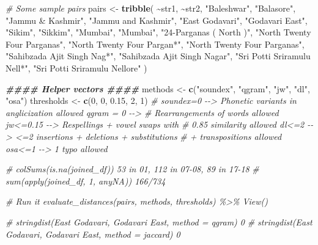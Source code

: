 \documentclass[
]{article}
\newenvironment{Shaded}{\begin{snugshade}}{\end{snugshade}}
\newcommand{\CommentTok}[1]{\textcolor[rgb]{0.56,0.35,0.01}{\textit{#1}}}
\newcommand{\DecValTok}[1]{\textcolor[rgb]{0.00,0.00,0.81}{#1}}
\newcommand{\DocumentationTok}[1]{\textcolor[rgb]{0.56,0.35,0.01}{\textbf{\textit{#1}}}}
\newcommand{\FloatTok}[1]{\textcolor[rgb]{0.00,0.00,0.81}{#1}}
\newcommand{\FunctionTok}[1]{\textcolor[rgb]{0.13,0.29,0.53}{\textbf{#1}}}
\newcommand{\NormalTok}[1]{#1}
\newcommand{\OtherTok}[1]{\textcolor[rgb]{0.56,0.35,0.01}{#1}}
\newcommand{\SpecialCharTok}[1]{\textcolor[rgb]{0.81,0.36,0.00}{\textbf{#1}}}
\newcommand{\StringTok}[1]{\textcolor[rgb]{0.31,0.60,0.02}{#1}}
\begin{document}
\begin{Shaded}
\begin{Highlighting}[]
\CommentTok{\# Some sample pairs}
\NormalTok{pairs }\OtherTok{\textless{}{-}} \FunctionTok{tribble}\NormalTok{(}
    \SpecialCharTok{\textasciitilde{}}\NormalTok{str1, }\SpecialCharTok{\textasciitilde{}}\NormalTok{str2, }\StringTok{"Baleshwar"}\NormalTok{, }\StringTok{"Balasore"}\NormalTok{, }\StringTok{"Jammu \& Kashmir"}\NormalTok{,}
    \StringTok{"Jammu and Kashmir"}\NormalTok{, }\StringTok{"East Godavari"}\NormalTok{, }\StringTok{"Godavari East"}\NormalTok{,}
    \StringTok{"Sikim"}\NormalTok{, }\StringTok{"Sikkim"}\NormalTok{, }\StringTok{"Mumbai"}\NormalTok{, }\StringTok{"Mumbai"}\NormalTok{, }\StringTok{"24{-}Parganas ( North )"}\NormalTok{,}
    \StringTok{"North Twenty Four Parganas"}\NormalTok{, }\StringTok{"North Twenty Four Pargan*"}\NormalTok{,}
    \StringTok{"North Twenty Four Parganas"}\NormalTok{, }\StringTok{"Sahibzada Ajit Singh Nag*"}\NormalTok{,}
    \StringTok{"Sahibzada Ajit Singh Nagar"}\NormalTok{, }\StringTok{"Sri Potti Sriramulu Nell*"}\NormalTok{,}
    \StringTok{"Sri Potti Sriramulu Nellore"}
\NormalTok{)}


\DocumentationTok{\#\#\#\# Helper vectors \#\#\#\#}
\NormalTok{methods }\OtherTok{\textless{}{-}} \FunctionTok{c}\NormalTok{(}\StringTok{"soundex"}\NormalTok{, }\StringTok{"qgram"}\NormalTok{, }\StringTok{"jw"}\NormalTok{, }\StringTok{"dl"}\NormalTok{, }\StringTok{"osa"}\NormalTok{)}
\NormalTok{thresholds }\OtherTok{\textless{}{-}} \FunctionTok{c}\NormalTok{(}\DecValTok{0}\NormalTok{, }\DecValTok{0}\NormalTok{, }\FloatTok{0.15}\NormalTok{, }\DecValTok{2}\NormalTok{, }\DecValTok{1}\NormalTok{)}
\CommentTok{\# soundex=0 {-}{-}\textgreater{} Phonetic variants in anglicization allowed qgram = 0 {-}{-}\textgreater{}}
\CommentTok{\# Rearrangements of words allowed jw\textless{}=0.15 {-}{-}\textgreater{} Respellings + vowel swaps with}
\CommentTok{\# 0.85 similarity allowed dl\textless{}=2 {-}{-}\textgreater{} \textless{}=2 insertions + deletions + substitutions}
\CommentTok{\# + transpositions allowed osa\textless{}=1 {-}{-}\textgreater{} 1 typo allowed}


\CommentTok{\# colSums(is.na(joined\_df)) 53 in 01, 112 in 07{-}08, 89 in 17{-}18}
\CommentTok{\# sum(apply(joined\_df, 1, anyNA)) 166/734}


\CommentTok{\# Run it evaluate\_distances(pairs, methods, thresholds) \%\textgreater{}\% View()}


\CommentTok{\# stringdist(\textquotesingle{}East Godavari\textquotesingle{}, \textquotesingle{}Godavari East\textquotesingle{}, method = \textquotesingle{}qgram\textquotesingle{}) 0}
\CommentTok{\# stringdist(\textquotesingle{}East Godavari\textquotesingle{}, \textquotesingle{}Godavari East\textquotesingle{}, method = \textquotesingle{}jaccard\textquotesingle{}) 0}
\end{Highlighting}
\end{Shaded}
\end{document}

